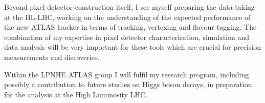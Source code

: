 Beyond pixel detector construction itself, I see myself preparing  the 
data taking at the HL-LHC, working on the understanding of the expected performance of the 
new ATLAS tracker in terms of tracking, vertexing and flavour tagging. The combination of my 
expertise in pixel detector characterisation, simulation and data analysis will be very important for these tools which are crucial for precision measurements and discoveries.  

Within the LPNHE ATLAS group I will fulfil my research program, including possibly 
a contribution to future studies on Higgs boson decays, in preparation for the analysis 
at the High Luminosity LHC.

